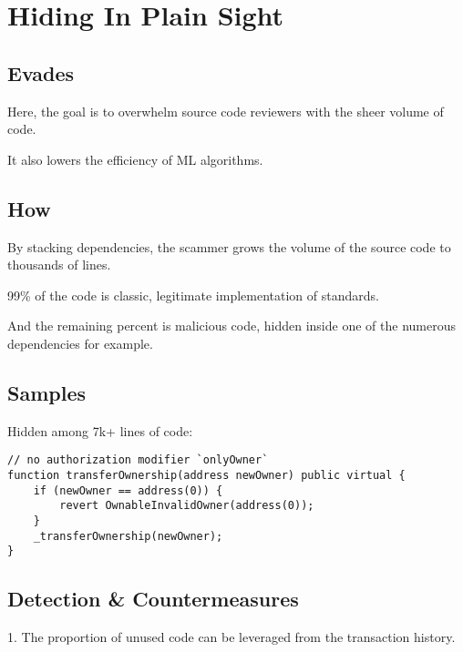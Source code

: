 \section{Hiding In Plain Sight}

\subsection{Evades}

Here, the goal is to overwhelm source code reviewers with the sheer volume of code.

It also lowers the efficiency of ML algorithms.

\subsection{How}

By stacking dependencies, the scammer grows the volume of the source code to thousands of lines.

99\% of the code is classic, legitimate implementation of standards.

And the remaining percent is malicious code, hidden inside one of the numerous dependencies for example.

\subsection{Samples}

Hidden among 7k+ lines of code:

\begin{highlight}\begin{lstlisting}
// no authorization modifier `onlyOwner`
function transferOwnership(address newOwner) public virtual {
    if (newOwner == address(0)) {
        revert OwnableInvalidOwner(address(0));
    }
    _transferOwnership(newOwner);
}
\end{lstlisting}\end{highlight}

\subsection{Detection \& Countermeasures}

1. The proportion of unused code can be leveraged from the transaction history.
